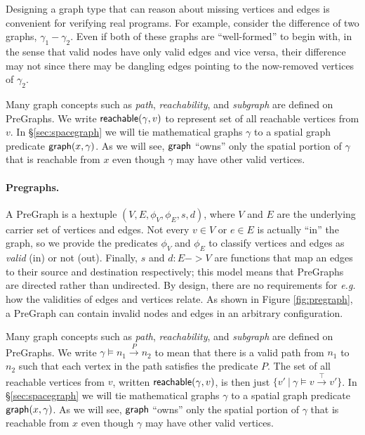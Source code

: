 Designing a graph type that can reason about missing vertices and edges is convenient for verifying real programs.  For example, consider the difference of two graphs, $\gamma_1 - \gamma_2$.  Even if both of these graphs are ``well-formed'' to begin with, in the sense that valid nodes have only valid edges and vice versa, their difference may not since there may be dangling edges pointing to the now-removed vertices of $\gamma_2$.

Many graph concepts such as \emph{path}, \emph{reachability}, and \emph{subgraph} are defined on PreGraphs.  We write $\mathsf{reachable}(\gamma,v)$ to represent set of all reachable vertices from $v$. 
In \S\ref{sec:spacegraph} we will tie mathematical graphs $\gamma$ to a spatial graph predicate
$\mathsf{graph}(x, \gamma)$.   As we will see, $\mathsf{graph}$ ``owns'' only the
spatial portion of $\gamma$ that is reachable
from $x$ even though $\gamma$ may have other valid vertices.
\fi
\iffalse
\paragraph{Pregraphs.} A PreGraph is a hextuple $(V, E, \phi_V, \phi_E, s, d)$,
where $V$ and $E$ are the underlying carrier set of vertices and edges.  Not every $v \in V$ or $e \in E$ is actually ``in'' the graph, so we provide the predicates $\phi_V$ and $\phi_E$ to classify vertices and edges as \emph{valid} (in) or not (out).  Finally, $s$ and $d : E -> V$ are functions that map an edges to their source and destination respectively; this model means that PreGraphs are directed rather than undirected.  By design, there are no requirements for \emph{e.g.} how the validities of edges and vertices relate.  As shown in Figure \ref{fig:pregraph}, a PreGraph can contain invalid nodes and edges in an arbitrary configuration.

Many graph concepts such as \emph{path}, \emph{reachability}, and \emph{subgraph} are defined on PreGraphs.  We write $\gamma\models n_1 \xrightarrow{P} n_2$ to mean that there is a valid path from $n_1$ to $n_2$ such that each vertex in the path satisfies the predicate $P$.  The set of all reachable vertices from $v$, written $\mathsf{reachable}(\gamma,v)$, is then just $\{v' ~|~ \gamma\models v \xrightarrow{\top} v'\}$.
In \S\ref{sec:spacegraph} we will tie mathematical graphs $\gamma$ to a spatial graph predicate
$\mathsf{graph}(x, \gamma)$.   As we will see, $\mathsf{graph}$ ``owns'' only the
spatial portion of $\gamma$ that is reachable
from $x$ even though $\gamma$ may have other valid vertices.

